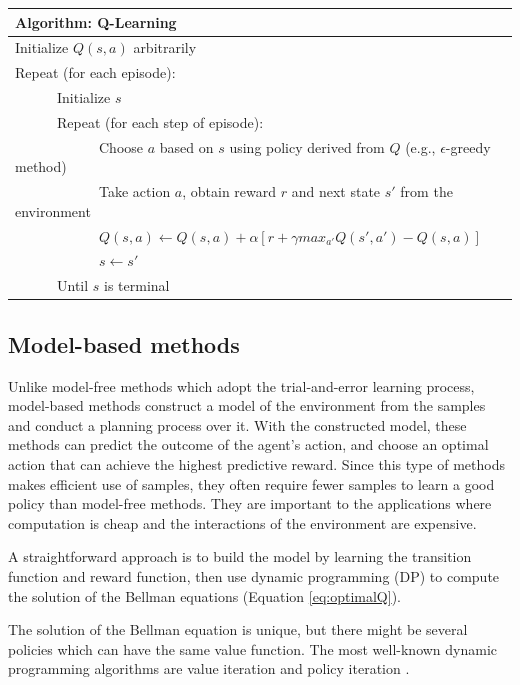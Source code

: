 \begin{center}
\begin{tabular}{@{}lp{6cm}@{}}
\hline
Algorithm: Q-Learning\\
\hline
Initialize $Q(s, a)$ arbitrarily\\
Repeat (for each episode):\\
\ \ \ \ \ \ Initialize $s$\\
\ \ \ \ \ \ Repeat (for each step of episode):\\
\ \ \ \ \ \ \ \ \ \ \ \ Choose $a$ based on $s$ using policy derived from $Q$ (e.g., $\epsilon$-greedy method)\\
\ \ \ \ \ \ \ \ \ \ \ \ Take action $a$, obtain reward $r$ and next state $s'$ from the environment\\
\ \ \ \ \ \ \ \ \ \ \ \ $Q(s, a) \leftarrow Q(s, a) + \alpha [r + \gamma max_{a'} Q(s', a')-Q(s, a)]$\\
\ \ \ \ \ \ \ \ \ \ \ \ $s \leftarrow s'$\\
\ \ \ \ \ \ Until $s$ is terminal\\
\hline  
\end{tabular}
\end{center}

\subsection{Model-based methods}
\label{se:modelbased}
Unlike model-free methods which adopt the trial-and-error learning process,
model-based methods construct a model of the environment from the samples and
conduct a planning process over it. With the constructed model, these methods
can predict the outcome of the agent's action, and choose an optimal action
that can achieve the highest predictive reward. Since this type of methods
makes efficient use of samples, they often require fewer samples to learn a
good policy than model-free methods. They are important to the applications
where computation is cheap and the interactions of the environment are
expensive.

A straightforward approach is to build the model by learning the transition function and
reward function, then use dynamic programming (DP) to compute the solution of the
Bellman equations (Equation \ref{eq:optimalQ}).

The solution of the Bellman equation is unique, but there might be several policies
which can have the same value function. The most well-known dynamic
programming algorithms are value iteration \cite{Bellman57} and policy
iteration \cite{Howard1960}.

